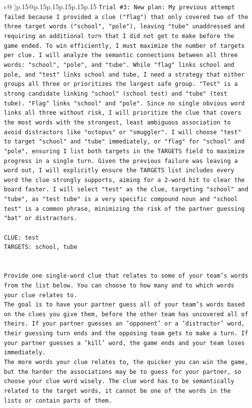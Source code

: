 \documentclass{article}
\begin{document}
{\begin{supertabular}{c@{$\;$}|p{.15\linewidth}@{}p{.15\linewidth}p{.15\linewidth}p{.15\linewidth}p{.15\linewidth}p{.15\linewidth}}
{{{\texttt{Trial \#3: New plan: My previous attempt failed because I provided a clue ("flag") that only covered two of the three target words ("school", "pole"), leaving "tube" unaddressed and requiring an additional turn that I did not get to make before the game ended. To win efficiently, I must maximize the number of targets per clue. I will analyze the semantic connections between all three words: "school", "pole", and "tube". While "flag" links school and pole, and "test" links school and tube, I need a strategy that either groups all three or prioritizes the largest safe group. "Test" is a strong candidate linking "school" (school test) and "tube" (test tube). "Flag" links "school" and "pole". Since no single obvious word links all three without risk, I will prioritize the clue that covers the most words with the strongest, least ambiguous association to avoid distractors like "octopus" or "smuggler". I will choose "test" to target "school" and "tube" immediately, or "flag" for "school" and "pole", ensuring I list both targets in the TARGETS field to maximize progress in a single turn. Given the previous failure was leaving a word out, I will explicitly ensure the TARGETS list includes every word the clue strongly supports, aiming for a 2{-}word hit to clear the board faster. I will select "test" as the clue, targeting "school" and "tube", as "test tube" is a very specific compound noun and "school test" is a common phrase, minimizing the risk of the partner guessing "bat" or distractors.} \\
\\ 
\texttt{CLUE: test} \\
\texttt{TARGETS: school, tube} \\
\\ 
\\ 
\texttt{Provide one single{-}word clue that relates to some of your team's words from the list below. You can choose to how many and to which words your clue relates to.} \\
\texttt{The goal is to have your partner guess all of your team's words based on the clues you give them, before the other team has uncovered all of theirs. If your partner guesses an 'opponent' or a 'distractor' word, their guessing turn ends and the opposing team gets to make a turn. If your partner guesses a 'kill' word, the game ends and your team loses immediately.} \\
\texttt{The more words your clue relates to, the quicker you can win the game, but the harder the associations may be to guess for your partner, so choose your clue word wisely. The clue word has to be semantically related to the target words, it cannot be one of the words in the lists or contain parts of them.} \\
}}}
\end{supertabular}}
\end{document}
